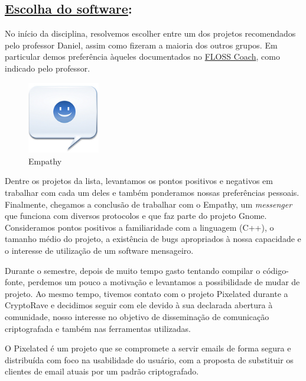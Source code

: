 \subsection*{\underline{Escolha do software}:}

No início da disciplina, resolvemos escolher entre um dos projetos
recomendados pelo professor Daniel, assim como fizeram a maioria dos outros
grupos. Em particular demos preferência àqueles documentados no
\href{http://flosscoach.com}{FLOSS Coach}, como indicado pelo professor.

\begin{figure} %
\begin{center}
\includegraphics[width=0.28\textwidth]{src/empathy_logo.jpg}
\caption*{Empathy}
\end{center}
\end{figure}

Dentre os projetos da lista, levantamos os pontos positivos e negativos
em trabalhar com cada um deles e também ponderamos nossas preferências
pessoais. Finalmente, chegamos a conclusão de trabalhar com o Empathy, um
\emph{messenger} que funciona com diversos protocolos e que faz parte do projeto
Gnome. Consideramos pontos positivos a familiaridade com a linguagem (C++), o
tamanho médio do projeto, a existência de bugs apropriados à nossa capacidade e
o interesse de utilização de um software mensageiro.

Durante o semestre, depois
de muito tempo gasto tentando compilar o código-fonte, perdemos um pouco a
motivação e levantamos a possibilidade de mudar de projeto.
Ao mesmo tempo, tivemos
contato com o projeto Pixelated durante a CryptoRave e decidimos seguir com ele
devido à sua declarada abertura à comunidade, nosso interesse no objetivo de
disseminação de comunicação criptografada e também nas ferramentas utilizadas.

O Pixelated é um projeto que se compromete a servir emails de forma segura e
distribuída com foco na usabilidade do usuário, com a
proposta de substituir os clientes de email atuais por um padrão criptografado.